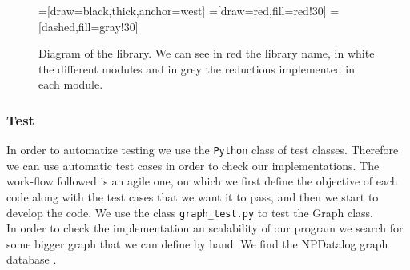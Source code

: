   
\begin{figure}[h]
\begin{center}
=[draw=black,thick,anchor=west]
=[draw=red,fill=red!30]
=[dashed,fill=gray!30]
  \caption{Diagram of the library. We can see in red the library name, in white the different modules and in grey the reductions implemented in each module. }
\label{fig:org}
\end{center}
\end{figure}


\newpage
\subsubsection{Test}

In order to automatize testing we use the \texttt{Python} class of test classes. Therefore we can use automatic test cases in order to check our implementations. The work-flow followed is an agile one, on which we first define the objective of each code along with the test cases that we want it to pass, and then we start to develop the code. 
We use the class \texttt{graph\_test.py} to test the Graph class. \\

In order to check the implementation an scalability of our program we search for some bigger graph that we can define by hand. We find the NPDatalog graph database \cite{NPDatalog}.